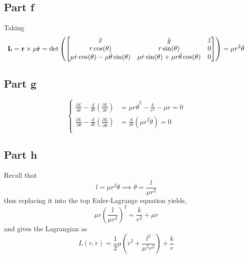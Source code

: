 \documentclass[12pt]{report}
\newcommand{\rb}{\bold{r}}
\begin{document}
\subsection*{Part f}
Taking 
\begin{equation*}
    \bold{L} = \rb \times \mu \dot{\rb} = \det\left(\begin{bmatrix}
        \hat{x} & \hat{y} & \hat{z} \\
        r\cos(\theta) & r\sin(\theta) & 0 \\
        \mu \dot{r}\cos(\theta) - \mu\dot{\theta} \sin(\theta) & \mu\dot{r}\sin(\theta) + \mu r \dot{\theta} \cos(\theta) & 0
    \end{bmatrix}\right) = \mu r^2 \dot{\theta}
\end{equation*}
\subsection*{Part g}
\begin{equation*}
    \begin{cases}
        \frac{\partial L}{\partial r} - \frac{d}{dt}\left(\frac{\partial L}{\partial \dot{r}}\right) &= \mu r \dot{\theta}^2 - \frac{k}{r^2} - \mu \ddot{r} = 0 \\
        \frac{\partial L}{\partial \theta} - \frac{d}{dt}\left(\frac{\partial L}{\partial \dot{\theta}}\right) &=\frac{d}{dt}(\mu r^2 \dot{\theta}) = 0 \\
    \end{cases}
\end{equation*}
\subsection*{Part h}
Recall that
\begin{equation*}
    l = \mu r^2 \dot{\theta} \implies \dot{\theta} = \frac{l}{\mu r^2}
\end{equation*}
thus replacing it into the top Euler-Lagrange equation yields,
\begin{equation*}
    \mu r \left(\frac{l}{\mu r^2}\right)^2 = \frac{k}{r^2} + \mu \ddot{r}
\end{equation*}
and gives the Lagrangian as
\begin{equation*}
    L(r,\dot{r}) = \frac{1}{2}\mu \left(\dot{r}^2 + \frac{l^2}{\mu^2r^2}\right) + \frac{k}{r}
\end{equation*}
\end{document}
